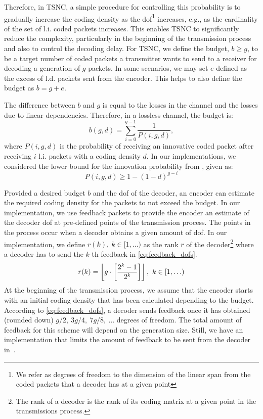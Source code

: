 Therefore, in \ac{TSNC}, a simple procedure for controlling this probability
is to gradually increase the coding density as the \ac{dof}\footnote{We refer
as degrees of freedom to the dimension of the linear span from the coded
packets that a decoder has at a given point} increases, e.g., as the
cardinality of the set of \ac{l.i.} coded packets increases. This enables
\ac{TSNC} to significantly reduce the complexity, particularly in the
beginning of the transmission process and also to control the decoding
delay. For \ac{TSNC}, we define the budget, $b \geq g$, to be a target
number of coded packets a transmitter wants to send to a receiver
for decoding a generation of $g$ packets. In some scenarios, we may set
$e$ defined as the excess of \ac{l.d.} packets sent from the encoder.
This helps to also define the budget as $b = g + e$.

The difference between $b$ and $g$ is equal to the losses in the channel
and the losses due to linear dependencies. Therefore, in a lossless
channel, the budget is:
\begin{equation}\label{eq:budget}
    b(g,d)=\sum^{g-1}_{i=0}\frac{1}{P(i,g,d)},
\end{equation}
where $P(i,g,d)$ is the probability of receiving an innovative coded packet
after receiving $i$ \ac{l.i.} packets with a coding density $d$. In our
implementations, we considered the lower bound for the innovation probability
from \cite{feizi2014tunable}, given as:
\begin{equation}
    P(i,g,d) \geq 1-(1-d)^{g-i}
\end{equation}

Provided a desired budget $b$ and the \ac{dof} of the decoder, an encoder
can estimate the required coding density for the packets to not exceed the
budget. In our implementation, we use feedback packets to provide the
encoder an estimate of the decoder \ac{dof} at pre-defined points of the
transmission process. The points in the process occur when a decoder
obtains a given amount of \ac{dof}. In our implementation, we define $r(k),\
k \in [1, \ldots)$ as the rank $r$ of the decoder\footnote{The rank of
a decoder is the rank of its coding matrix at a given point in the
transmissions process.} where a decoder has to send the $k$-th feedback in
\eqref{eq:feedback_dofs}.
%
\begin{equation}\label{eq:feedback_dofs}
    r(k) = \left\lfloor g\cdot \left[\frac{2^k -1}{2^k}\right]\right\rfloor,\ k \in [1,\ldots)
\end{equation}
%
At the beginning of the transmission process, we assume that the encoder
starts with an initial coding density that has been calculated depending to
the budget. According to \eqref{eq:feedback_dofs}, a decoder sends feedback
once it has obtained (rounded down) $g/2,\ 3g/4,\ 7g/8,\ \ldots$  degrees of
freedom. The total amount of feedback for this scheme will depend on the
generation size. Still, we have an implementation that limits the amount of
feedback to be sent from the decoder in~\cite{practicalview_tsnc2015}.

